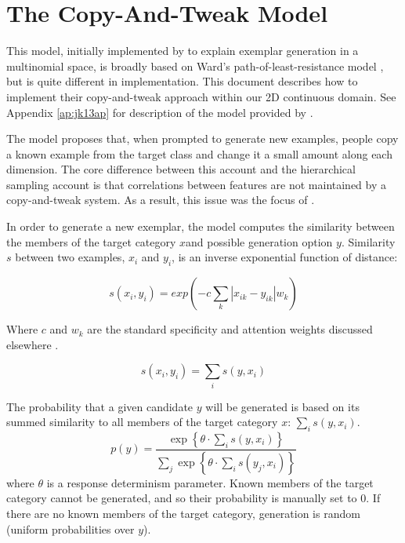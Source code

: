 \documentclass[12pt]{article}
\begin{document}
\section{The Copy-And-Tweak Model}

This model, initially implemented by \cite{jern2013probabilistic} to explain exemplar generation in a multinomial space, is broadly based on Ward's path-of-least-resistance model \citep{ward1994structured,ward1995s,ward2002role}, but is quite different in implementation. This document describes how to implement their copy-and-tweak approach within our 2D continuous domain. See Appendix \ref{ap:jk13ap} for description of the model provided by \cite{jern2013probabilistic}.

The model proposes that, when prompted to generate new examples, people copy a known example from the target class and change it a small amount along each dimension. The core difference between this account and the hierarchical sampling account is that correlations between features are not maintained by a copy-and-tweak system. As a result, this issue was the focus of \cite{jern2013probabilistic}.

In order to generate a new exemplar, the model computes the similarity between the members of the target category $x$and possible generation option $y$. Similarity $s$ between two examples, $x_i$ and $y_i$, is an inverse exponential function of distance:

\begin{equation}
  s(x_i,y_i) = exp( -c \sum_k{|x_{ik} - y_{ik}|w_k})
\end{equation}

Where $c$ and $w_k$ are the standard specificity and attention weights discussed elsewhere \citep[see][]{nosofsky1984choice}.

\begin{equation}
  s(x_i,y_i) = \sum_i{s(y, x_i)}
\end{equation}

The probability that a given candidate $y$ will be generated is based on its summed similarity to all members of the target category $x$: $\sum_i{s(y, x_i)}$.
\begin{equation}
    p(y)  = \dfrac
    { \exp \left\{\theta \cdot \sum_i{s(y, x_i)} \right\} }
    {\sum_j{\exp \left\{ \theta \cdot \sum_i{s(y_j, x_i)} \right\} }} 
    \label{eq:generation-choice}
\end{equation}
% 
where $\theta$ is a response determinism parameter. Known members of the target category cannot be generated, and so their probability is manually set to 0. If there are no known members of the target category, generation is random (uniform probabilities over $y$).
\end{document}
